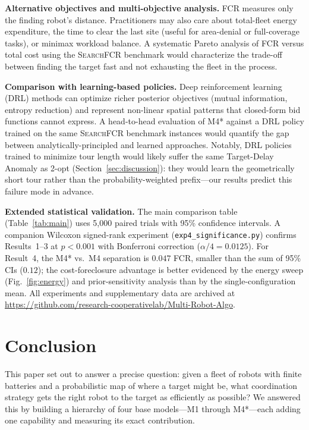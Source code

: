 \documentclass[conference]{IEEEtran}
\begin{document}
\textbf{Alternative objectives and multi-objective analysis.}
FCR measures only the finding robot's distance.
Practitioners may also care about total-fleet energy expenditure, the time
to clear the last site (useful for area-denial or full-coverage tasks), or
minimax workload balance.
A systematic Pareto analysis of FCR versus total cost using the
\textsc{SearchFCR} benchmark would characterize the trade-off between
finding the target fast and not exhausting the fleet in the process.

\textbf{Comparison with learning-based policies.}
Deep reinforcement learning (DRL) methods can optimize richer posterior
objectives (mutual information, entropy reduction) and represent non-linear
spatial patterns that closed-form bid functions cannot express.
A head-to-head evaluation of M4* against a DRL policy trained on the same
\textsc{SearchFCR} benchmark instances would quantify the gap between
analytically-principled and learned approaches.
Notably, DRL policies trained to minimize tour length would likely suffer
the same Target-Delay Anomaly as 2-opt (Section~\ref{sec:discussion}):
they would learn the geometrically short tour rather than the
probability-weighted prefix---our results predict this failure mode in
advance.

\textbf{Extended statistical validation.}
The main comparison table (Table~\ref{tab:main}) uses 5,000 paired trials
with 95\% confidence intervals.
A companion Wilcoxon signed-rank experiment (\texttt{exp4\_significance.py})
confirms Results~1--3 at $p < 0.001$ with Bonferroni correction ($\alpha/4 = 0.0125$).
For Result~4, the M4* vs.\ M4 separation is $0.047$ FCR, smaller than the
sum of 95\% CIs ($0.12$); the cost-foreclosure advantage is better evidenced
by the energy sweep (Fig.~\ref{fig:energy}) and prior-sensitivity analysis
than by the single-configuration mean.
All experiments and supplementary data are archived at
\url{https://github.com/research-cooperativelab/Multi-Robot-Algo}.

\section{Conclusion}\label{sec:conclusion}

This paper set out to answer a precise question: given a fleet of robots with
finite batteries and a probabilistic map of where a target might be, what
coordination strategy gets the right robot to the target as efficiently as
possible?
We answered this by building a hierarchy of four base models---M1 through
M4*---each adding one capability and measuring its exact contribution.
\end{document}
